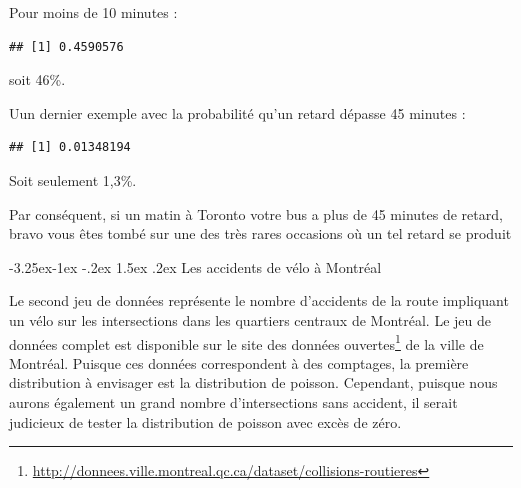 \documentclass[
  11pt,
  french,
]{book}
\makeatletter
\newenvironment{Shaded}{\begin{snugshade}}{\end{snugshade}}
\newcommand{\DataTypeTok}[1]{\textcolor[rgb]{0.13,0.29,0.53}{#1}}
\newcommand{\DecValTok}[1]{\textcolor[rgb]{0.00,0.00,0.81}{#1}}
\newcommand{\KeywordTok}[1]{\textcolor[rgb]{0.13,0.29,0.53}{\textbf{#1}}}
\newcommand{\NormalTok}[1]{#1}
\newcommand{\OperatorTok}[1]{\textcolor[rgb]{0.81,0.36,0.00}{\textbf{#1}}}
\renewcommand{\href}[2]{#2\footnote{\url{#1}}}
\newenvironment{kframe}{%
\medskip{}
\setlength{\fboxsep}{.8em}
 \def\at@end@of@kframe{}%
 \ifinner\ifhmode%
  \def\at@end@of@kframe{\end{minipage}}%
  \begin{minipage}{\columnwidth}%
 \fi\fi%
 \def\FrameCommand##1{\hskip\@totalleftmargin \hskip-\fboxsep
 \colorbox{shadecolor}{##1}\hskip-\fboxsep
     \hskip-\linewidth \hskip-\@totalleftmargin \hskip\columnwidth}%
 \MakeFramed {\advance\hsize-\width
   \@totalleftmargin\z@ \linewidth\hsize
   \@setminipage}}%
 {\par\unskip\endMakeFramed%
 \at@end@of@kframe}
\renewenvironment{Shaded}{\begin{kframe}}{\end{kframe}}
\renewcommand\paragraph{\@startsection{paragraph}{4}{\z@}%
   {-3.25ex\@plus -1ex \@minus -.2ex}%
   {1.5ex \@plus .2ex}%
   {\normalfont\normalsize\bfseries}}
\makeatother
\begin{document}
Pour moins de 10 minutes :

\begin{Shaded}
\end{Shaded}

\begin{verbatim}
## [1] 0.4590576
\end{verbatim}

soit 46\%.

Uun dernier exemple avec la probabilité qu'un retard dépasse 45 minutes :

\begin{Shaded}
\end{Shaded}

\begin{verbatim}
## [1] 0.01348194
\end{verbatim}

Soit seulement 1,3\%.

Par conséquent, si un matin à Toronto votre bus a plus de 45 minutes de retard, bravo vous êtes tombé sur une des très rares occasions où un tel retard se produit

\hypertarget{les-accidents-de-vuxe9lo-uxe0-montruxe9al}{%
\paragraph{Les accidents de vélo à Montréal}\label{les-accidents-de-vuxe9lo-uxe0-montruxe9al}}

Le second jeu de données représente le nombre d'accidents de la route impliquant un vélo sur les intersections dans les quartiers centraux de Montréal. Le jeu de données complet est disponible sur le site des \href{http://donnees.ville.montreal.qc.ca/dataset/collisions-routieres}{données ouvertes} de la ville de Montréal. Puisque ces données correspondent à des comptages, la première distribution à envisager est la distribution de poisson. Cependant, puisque nous aurons également un grand nombre d'intersections sans accident, il serait judicieux de tester la distribution de poisson avec excès de zéro.
\end{document}
